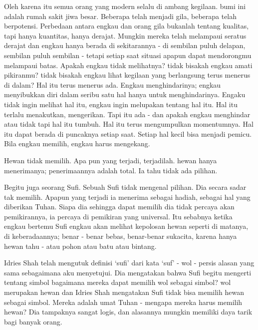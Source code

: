 Oleh karena itu semua orang yang modern selalu di ambang kegilaan. bumi ini adalah rumah sakit jiwa besar. Beberapa telah menjadi gila, beberapa telah berpotensi. Perbedaan antara engkau dan orang gila bukanlah tentang kualitas, tapi hanya kuantitas, hanya derajat. 
Mungkin mereka telah melampaui seratus derajat dan engkau hanya berada di sekitarannya - di sembilan puluh delapan, sembilan puluh sembilan - tetapi setiap saat situasi apapun dapat mendorongmu  melampaui batas. Apakah engkau tidak melihatnya? tidak bisakah engkau amati pikiranmu? tidak bisakah engkau lihat kegilaan yang berlangsung terus menerus di dalam? Hal itu terus menerus ada. Engkau menghindarinya; engkau menyibukkan diri dalam seribu satu hal hanya untuk menghindarinya. Engaku tidak ingin melihat hal itu, engkau ingin melupakan tentang hal itu. Hal itu terlalu menakutkan, mengerikan. Tapi itu ada - dan apakah engkau menghindar atau tidak tapi hal itu tumbuh. Hal itu terus mengumpulkan momentumnya. Hal itu dapat berada di puncaknya setiap saat. Setiap hal kecil bisa menjadi pemicu. Bila engkau memilih, engkau harus mengekang.

Hewan tidak memilih. Apa pun yang terjadi, terjadilah. hewan hanya menerimanya; penerimaannya adalah total. Ia tahu tidak ada pilihan.

Begitu juga seorang Sufi. Sebuah Sufi tidak mengenal pilihan. Dia secara sadar tak memilih. Apapun yang terjadi ia menerima sebagai hadiah, sebagai hal yang diberikan Tuhan. Siapa dia sehingga dapat memilih dia tidak percaya akan pemikirannya, ia percaya di pemikiran yang universal. Itu sebabnya ketika engkau bertemu Sufi engkau akan melihat kepolosan hewan seperti di matanya, di keberadaannya; benar - benar bebas, benar-benar sukacita, karena hanya hewan tahu - atau pohon atau batu atau bintang.

Idries Shah telah mengutuk definisi ‘sufi’ dari kata ‘suf’ - wol - persis alasan yang sama sebagaimana aku menyetujui. Dia mengatakan bahwa Sufi begitu mengerti tentang simbol bagaimana mereka dapat memilih wol sebagai simbol? wol merupakan hewan dan Idries Shah mengatakan Sufi tidak bisa memilih hewan sebagai simbol. Mereka adalah umat Tuhan - mengapa mereka harus memilih hewan? Dia tampaknya sangat logis, dan alasannya mungkin memiliki daya tarik bagi banyak orang.

